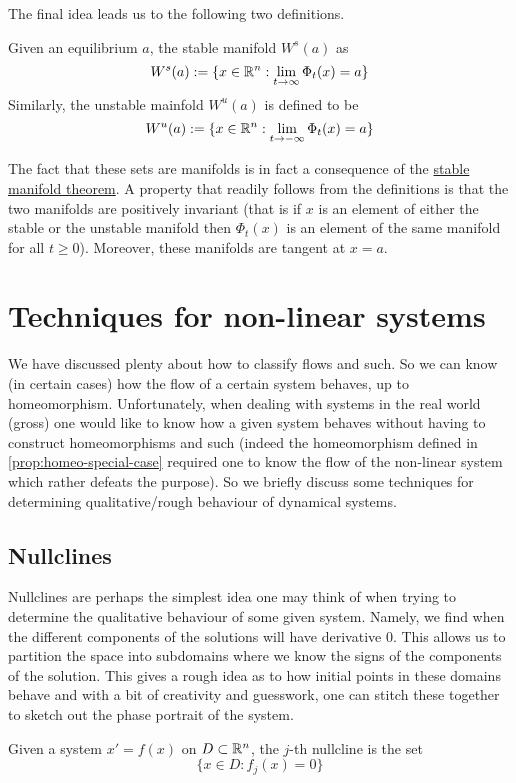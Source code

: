 The final idea leads us to the following two definitions.
\begin{definition}
Given an equilibrium $a$, the stable manifold $W^s(a)$ as
$$ W^s(a) := \{x \in \mathbb{R}^n: \lim_{t \to \infty} \Phi_t(x) = a\} $$
Similarly, the unstable mainfold $W^u(a)$ is defined to be
$$ W^u(a) := \{x \in \mathbb{R}^n: \lim_{t \to -\infty} \Phi_t(x) = a\} $$
\end{definition}
The fact that these sets are manifolds is in fact a consequence of the \href{https://en.wikipedia.org/wiki/Stable_manifold_theorem}{stable manifold theorem}. A property that readily follows from the definitions is that the two manifolds are positively invariant (that is if $x$ is an element of either the stable or the unstable manifold then $\Phi_t(x)$ is an element of the same manifold for all $t \geq 0$). Moreover, these manifolds are tangent at $x = a$.

\section{Techniques for non-linear systems}
We have discussed plenty about how to classify flows and such. So we can know (in certain cases) how the flow of a certain system behaves, up to homeomorphism. Unfortunately, when dealing with systems in the real world (gross) one would like to know how a given system behaves without having to construct homeomorphisms and such (indeed the homeomorphism defined in \autoref{prop:homeo-special-case} required one to know the flow of the non-linear system which rather defeats the purpose). So we briefly discuss some techniques for determining qualitative/rough behaviour of dynamical systems.

\subsection{Nullclines}
Nullclines are perhaps the simplest idea one may think of when trying to determine the qualitative behaviour of some given system. Namely, we find when the different components of the solutions will have derivative 0. This allows us to partition the space into subdomains where we know the signs of the components of the solution. This gives a rough idea as to how initial points in these domains behave and with a bit of creativity and guesswork, one can stitch these together to sketch out the phase portrait of the system. 

\begin{definition}[Nullcline]
Given a system $x' = f(x)$ on $D \subset \mathbb{R}^n$, the $j$-th nullcline is the set 
$$\{x \in D: f_j(x) = 0\}$$
\end{definition}
